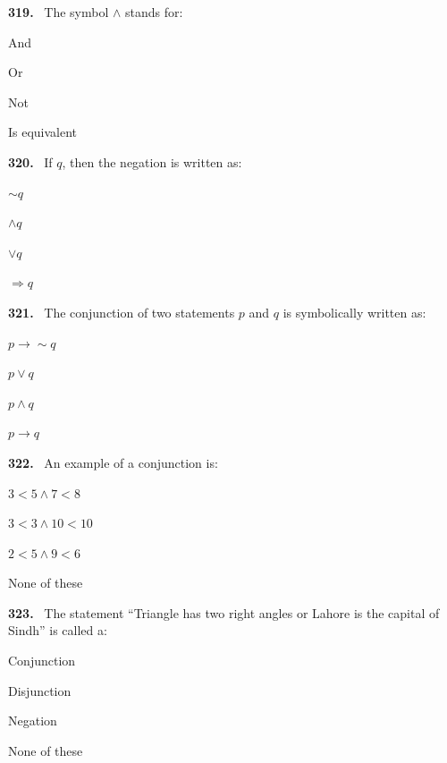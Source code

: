\documentclass[11pt]{article}
\newenvironment{qenv}[1]{%
  \par\medskip\noindent\textbf{#1.}\ \ignorespaces
}{\par}
\begin{document}
\begin{qenv}{319} The symbol $\wedge$ stands for:
\begin{options} \item And \item Or \item Not \item Is equivalent \end{options} \end{qenv}

\begin{qenv}{320} If $q$, then the negation is written as:
\begin{options} \item $\sim q$ \item $\wedge q$ \item $\vee q$ \item $\Rightarrow q$ \end{options} \end{qenv}

\begin{qenv}{321} The conjunction of two statements $p$ and $q$ is symbolically written as:
\begin{options} \item $p \to \sim q$ \item $p \vee q$ \item $p \wedge q$ \item $p \to q$ \end{options} \end{qenv}

\begin{qenv}{322} An example of a conjunction is:
\begin{options} \item $3<5 \wedge 7<8$ \item $3<3 \wedge 10<10$ \item $2<5 \wedge 9<6$ \item None of these \end{options} \end{qenv}

\begin{qenv}{323} The statement ``Triangle has two right angles or Lahore is the capital of Sindh'' is called a:
\begin{options} \item Conjunction \item Disjunction \item Negation \item None of these \end{options} \end{qenv}
\end{document}
